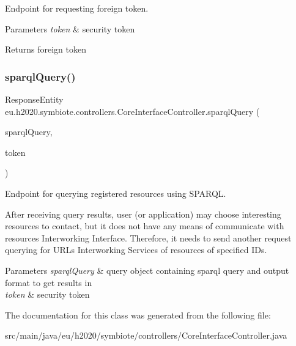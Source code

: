 Endpoint for requesting foreign token.


\begin{DoxyParams}{Parameters}
{\em token} & security token \\
\hline
\end{DoxyParams}
\begin{DoxyReturn}{Returns}
foreign token 
\end{DoxyReturn}
\mbox{\label{classeu_1_1h2020_1_1symbiote_1_1controllers_1_1CoreInterfaceController_a7ee735ef5179a5877209ae270e7f8465}} 
\subsubsection{\texorpdfstring{sparql\+Query()}{sparqlQuery()}}
{\footnotesize\ttfamily Response\+Entity eu.\+h2020.\+symbiote.\+controllers.\+Core\+Interface\+Controller.\+sparql\+Query (\begin{DoxyParamCaption}\item[{@Request\+Body Sparql\+Query\+Request}]{sparql\+Query,  }\item[{@Request\+Header(\char`\"{}X-\/Auth-\/Token\char`\"{}) String}]{token }\end{DoxyParamCaption})}

Endpoint for querying registered resources using S\+P\+A\+R\+QL. 

After receiving query results, user (or application) may choose interesting resources to contact, but it does not have any means of communicate with resources\textquotesingle{} Interworking Interface. Therefore, it needs to send another request querying for U\+R\+Ls Interworking Services of resources of specified I\+Ds.


\begin{DoxyParams}{Parameters}
{\em sparql\+Query} & query object containing sparql query and output format to get results in \\
\hline
{\em token} & security token \\
\hline
\end{DoxyParams}


The documentation for this class was generated from the following file\+:\begin{DoxyCompactItemize}
\item 
src/main/java/eu/h2020/symbiote/controllers/Core\+Interface\+Controller.\+java\end{DoxyCompactItemize}
